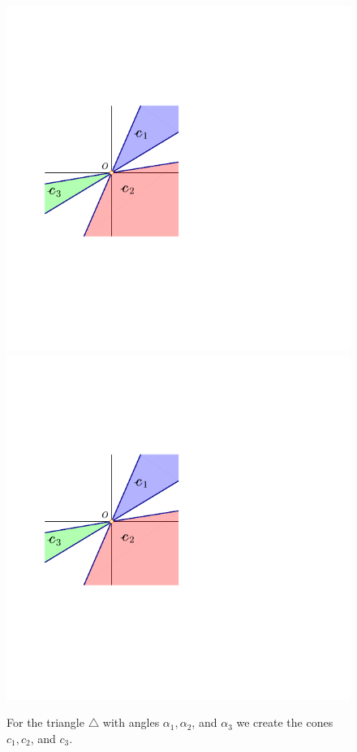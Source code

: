 \documentclass[12pt]{article}%
\begin{document}
\begin{figure}[h]
    \centering \phantom{}%
    \hfill%
    \includegraphics[page=1]{figs/triangle_cones}%
    \hfill%
    \includegraphics[page=2]{figs/triangle_cones}%
    \hfill%
    \phantom{}%
    \caption{For the triangle $\triangle$ with angles
       $\alpha_1,\alpha_2$, and $\alpha_3$ we create the cones
       $c_1,c_2$, and $c_3$.}
\end{figure}
\end{document}
